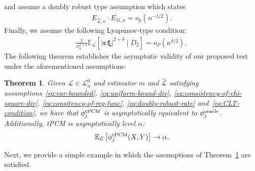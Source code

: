 \documentclass[12pt]{article}
\newtheorem{theorem}{Theorem}
\theoremstyle{definition}
\theoremstyle{remark}
\newcommand{\E}{\mathbb E}								%
\newcommand{\srx}{X}									%
\newcommand{\sry}{Y}									%
\newcommand{\law}{\mathcal L}							%
\newcommand{\nulllaws}{\mathscr L^0}					%
\newcommand{\lawhat}{\widehat{\mathcal L}}				%
\begin{document}
and assume a doubly robust type assumption which states 
\begin{align}\label{eq:doubly-robust-rate}
	E_{\lawhat,n} \cdot E_{\widehat m,n} = o_p(n^{-1/2}).
\end{align}  
Finally, we assume the following Lyapunov-type condition:
\begin{gather}\label{eq:CLT-condition}
	\frac{1}{\sigma_n^{2+\delta}}\E_\law\left[|\bm\varepsilon\bm\xi|^{2+\delta} \mid D_2\right] = o_P(n^{\delta/2}),
\end{gather}
The following theorem establishes the asymptotic validity of our proposed test under the aforementioned assumptions:
\begin{theorem}\label{thm:tower-pcm-type-I-error}
	Given $\law \in \nulllaws_n$ and estimator $\widehat m$ and $\lawhat$ satisfying assumptions~\eqref{eq:var-bounded}, \eqref{eq:uniform-bound-div}, \eqref{eq:consistency-of-chi-square-div}, \eqref{eq:consitency-of-reg-func}, \eqref{eq:doubly-robust-rate} and~\eqref{eq:CLT-condition},
	we have that $\phi_j^{\textnormal{tPCM}}$ is asymptotically equivalent to $\phi_j^{\textnormal{oracle}}$. Additionally, tPCM is asymptotically level $\alpha$:
	$$
	\E_{\law}\left[\phi_j^{\textnormal{tPCM}}(\srx,\sry)\right] \to \alpha.
	$$
\end{theorem}

Next, we provide a simple example in which the assumptions of Theorem~\ref{thm:tower-pcm-type-I-error} are satisfied. 
\end{document}
